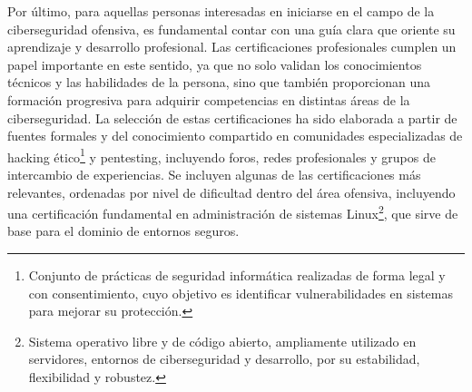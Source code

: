 \documentclass[a4paper, 11pt]{article}
\begin{document}
Por último, para aquellas personas interesadas en iniciarse en el campo de la ciberseguridad ofensiva, 
es fundamental contar con una guía clara que oriente su aprendizaje y desarrollo profesional. Las certificaciones 
profesionales cumplen un papel importante en este sentido, ya que no solo validan los conocimientos técnicos y las habilidades de la persona, sino que también proporcionan una formación progresiva para adquirir competencias en distintas áreas de la ciberseguridad. La selección de estas certificaciones ha sido elaborada a partir de fuentes formales y del conocimiento compartido en comunidades especializadas de hacking ético\footnote{Conjunto de prácticas de seguridad informática realizadas de forma legal y con consentimiento, cuyo objetivo es identificar vulnerabilidades en sistemas para mejorar su protección.} y pentesting, incluyendo foros, redes profesionales y grupos de intercambio de experiencias. Se incluyen algunas de las certificaciones más relevantes, ordenadas por nivel de dificultad dentro del área ofensiva, incluyendo una certificación fundamental en administración de sistemas Linux\footnote{Sistema operativo libre y de código abierto, ampliamente utilizado en servidores, entornos de ciberseguridad y desarrollo, por su estabilidad, flexibilidad y robustez.}, que sirve de base para el dominio de entornos seguros.
\end{document}
